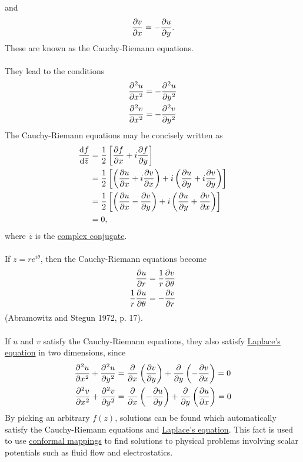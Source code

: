 \documentclass{article}
\begin{document}
and
\begin{equation} \label{eq:11}
    \diffp{v}x = -\diffp{u}y.
\end{equation}
These are known as the Cauchy-Riemann equations.\\ \\
They lead to the conditions
\begin{align}
    \diffp[2]{u}x &= -\diffp[2]{u}y \label{eq:12}\\
    \diffp[2]{v}x &= -\diffp[2]{v}y \label{eq:13}
\end{align}
The Cauchy-Riemann equations may be concisely written as
\begin{align}
\diff{f}{\bar{z}} &= \frac{1}{2}\left[\diffp{f}x + i\diffp{f}y\right] \label{eq:14}\\
&= \frac{1}{2}\left[\left(\diffp{u}x + i\diffp{v}x\right)+i\left(\diffp{u}y + i\diffp{v}y\right)\right] \label{eq:15}\\
&= \frac{1}{2}\left[\left(\diffp{u}x - \diffp{v}y\right)+i\left(\diffp{u}y + \diffp{v}x\right)\right] \label{eq:16}\\
&= 0,\label{eq:17}
\end{align}
where $\bar{z}$ is the \href{https://mathworld.wolfram.com/ComplexConjugate.html}{complex conjugate}.\\ \\
If $z = re^{i\theta}$, then the Cauchy-Riemann equations become
\begin{align}
    \diffp{u}r &= \frac{1}{r}\diffp{v}{\theta} \label{eq:18}\\
    \frac{1}{r}\diffp{u}{\theta} &= -\diffp{v}r \label{eq:19}
\end{align}
(Abramowitz and Stegun 1972, p. 17).\\ \\
If $u$ and $v$ satisfy the Cauchy-Riemann equations, they also satisfy \href{https://mathworld.wolfram.com/LaplacesEquation.html}{Laplace's equation} in two dimensions, since
\begin{align}
    \diffp[2]{u}x + \diffp[2]{u}y &= \diffp{}{x}\left(\diffp{v}y\right)+\diffp{}{y}\left(-\diffp{v}x\right)=0 \label{eq:20}\\
    \diffp[2]{v}x + \diffp[2]{v}y &= \diffp{}{x}\left(-\diffp{u}y\right)+\diffp{}{y}\left(\diffp{u}x\right)=0 \label{eq:21}
\end{align}
By picking an arbitrary $f(z)$, solutions can be found which automatically satisfy the Cauchy-Riemann equations and \href{https://mathworld.wolfram.com/LaplacesEquation.html}{Laplace's equation}. This fact is used to use \href{https://mathworld.wolfram.com/ConformalMapping.html}{conformal mappings} to find solutions to physical problems involving scalar potentials such as fluid flow and electrostatics.
\end{document}
